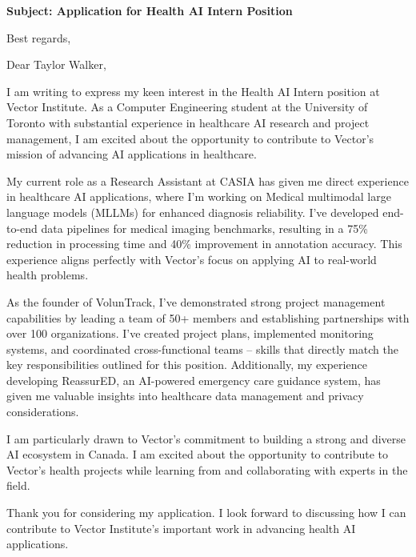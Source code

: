 \documentclass[11pt,a4paper,roman]{moderncv}
\begin{document}
\date{\today}
\opening{\textbf{Subject: Application for Health AI Intern Position}}
\closing{Best regards,}

\makelettertitle

Dear Taylor Walker,

I am writing to express my keen interest in the Health AI Intern position at Vector Institute. As a Computer Engineering student at the University of Toronto with substantial experience in healthcare AI research and project management, I am excited about the opportunity to contribute to Vector's mission of advancing AI applications in healthcare.

My current role as a Research Assistant at CASIA has given me direct experience in healthcare AI applications, where I'm working on Medical multimodal large language models (MLLMs) for enhanced diagnosis reliability. I've developed end-to-end data pipelines for medical imaging benchmarks, resulting in a 75\% reduction in processing time and 40\% improvement in annotation accuracy. This experience aligns perfectly with Vector's focus on applying AI to real-world health problems.

As the founder of VolunTrack, I've demonstrated strong project management capabilities by leading a team of 50+ members and establishing partnerships with over 100 organizations. I've created project plans, implemented monitoring systems, and coordinated cross-functional teams – skills that directly match the key responsibilities outlined for this position. Additionally, my experience developing ReassurED, an AI-powered emergency care guidance system, has given me valuable insights into healthcare data management and privacy considerations.

I am particularly drawn to Vector's commitment to building a strong and diverse AI ecosystem in Canada. I am excited about the opportunity to contribute to Vector's health projects while learning from and collaborating with experts in the field.

Thank you for considering my application. I look forward to discussing how I can contribute to Vector Institute's important work in advancing health AI applications.

\makeletterclosing
\end{document}
